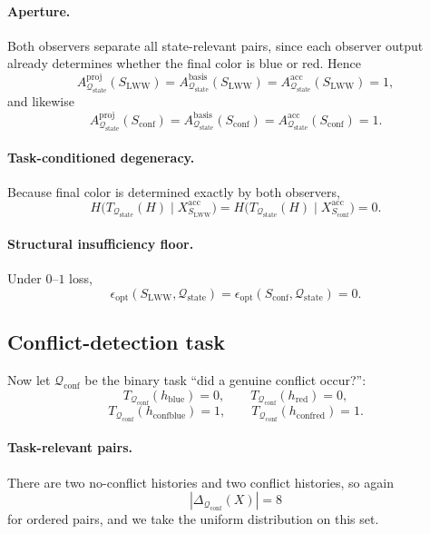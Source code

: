 \documentclass[11pt,twoside]{article}
\theoremstyle{definition}
\newcommand{\proj}{\mathrm{proj}}
\newcommand{\basis}{\mathrm{basis}}
\newcommand{\acc}{\mathrm{acc}}
\newcommand{\blue}{\mathrm{blue}}
\newcommand{\red}{\mathrm{red}}
\newcommand{\conf}{\mathrm{conf}}
\begin{document}
\paragraph{Aperture.}
Both observers separate all state-relevant pairs, since each observer output already determines whether the final color is blue or red. Hence
\[
  A^{\proj}_{\mathcal{Q}_{\mathrm{state}}}(S_{\mathrm{LWW}})
  =
  A^{\basis}_{\mathcal{Q}_{\mathrm{state}}}(S_{\mathrm{LWW}})
  =
  A^{\acc}_{\mathcal{Q}_{\mathrm{state}}}(S_{\mathrm{LWW}})
  = 1,
\]
and likewise
\[
  A^{\proj}_{\mathcal{Q}_{\mathrm{state}}}(S_{\mathrm{conf}})
  =
  A^{\basis}_{\mathcal{Q}_{\mathrm{state}}}(S_{\mathrm{conf}})
  =
  A^{\acc}_{\mathcal{Q}_{\mathrm{state}}}(S_{\mathrm{conf}})
  = 1.
\]

\paragraph{Task-conditioned degeneracy.}
Because final color is determined exactly by both observers,
\[
  H\!\bigl(T_{\mathcal{Q}_{\mathrm{state}}}(H)\mid X_{S_{\mathrm{LWW}}}^{\acc}\bigr)
  =
  H\!\bigl(T_{\mathcal{Q}_{\mathrm{state}}}(H)\mid X_{S_{\mathrm{conf}}}^{\acc}\bigr)
  =
  0.
\]

\paragraph{Structural insufficiency floor.}
Under \(0\)--\(1\) loss,
\[
  \epsilon_{\mathrm{opt}}(S_{\mathrm{LWW}},\mathcal{Q}_{\mathrm{state}})
  =
  \epsilon_{\mathrm{opt}}(S_{\mathrm{conf}},\mathcal{Q}_{\mathrm{state}})
  =
  0.
\]

\subsection{Conflict-detection task}
\label{app:conflict-detection-task}

Now let \(\mathcal{Q}_{\mathrm{conf}}\) be the binary task ``did a genuine conflict occur?'':
\[
  T_{\mathcal{Q}_{\mathrm{conf}}}(h_{\blue})=0,
  \qquad
  T_{\mathcal{Q}_{\mathrm{conf}}}(h_{\red})=0,
\]
\[
  T_{\mathcal{Q}_{\mathrm{conf}}}(h_{\conf\blue})=1,
  \qquad
  T_{\mathcal{Q}_{\mathrm{conf}}}(h_{\conf\red})=1.
\]

\paragraph{Task-relevant pairs.}
There are two no-conflict histories and two conflict histories, so again
\[
  |\Delta_{\mathcal{Q}_{\mathrm{conf}}}(X)|=8
\]
for ordered pairs, and we take the uniform distribution on this set.
\end{document}
